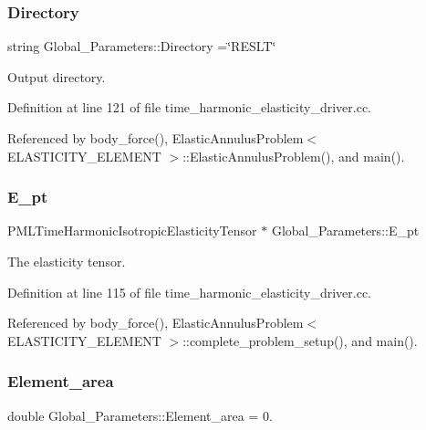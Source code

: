 \subsubsection{\texorpdfstring{Directory}{Directory}}
{\footnotesize\ttfamily string Global\+\_\+\+Parameters\+::\+Directory =\char`\"{}R\+E\+S\+LT\char`\"{}}



Output directory. 



Definition at line 121 of file time\+\_\+harmonic\+\_\+elasticity\+\_\+driver.\+cc.



Referenced by body\+\_\+force(), Elastic\+Annulus\+Problem$<$ E\+L\+A\+S\+T\+I\+C\+I\+T\+Y\+\_\+\+E\+L\+E\+M\+E\+N\+T $>$\+::\+Elastic\+Annulus\+Problem(), and main().

\mbox{\label{namespaceGlobal__Parameters_a9dc0631434879b47501f64851ad679b8}} 
\subsubsection{\texorpdfstring{E\+\_\+pt}{E\_pt}}
{\footnotesize\ttfamily P\+M\+L\+Time\+Harmonic\+Isotropic\+Elasticity\+Tensor $\ast$ Global\+\_\+\+Parameters\+::\+E\+\_\+pt}



The elasticity tensor. 



Definition at line 115 of file time\+\_\+harmonic\+\_\+elasticity\+\_\+driver.\+cc.



Referenced by body\+\_\+force(), Elastic\+Annulus\+Problem$<$ E\+L\+A\+S\+T\+I\+C\+I\+T\+Y\+\_\+\+E\+L\+E\+M\+E\+N\+T $>$\+::complete\+\_\+problem\+\_\+setup(), and main().

\mbox{\label{namespaceGlobal__Parameters_af365b0769e142cabdaed848057332858}} 
\subsubsection{\texorpdfstring{Element\+\_\+area}{Element\_area}}
{\footnotesize\ttfamily double Global\+\_\+\+Parameters\+::\+Element\+\_\+area = 0.}



